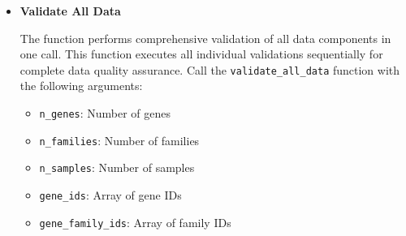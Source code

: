 \begin{enumerate}
\begin{itemize}
\begin{itemize}
                    \item \texttt{expression\_vectors}: 2D array of expression data (samples
                          × genes)
                          
                    \item \texttt{family\_centroids}: 2D array of family centroids (samples
                          × families)
                          
                    \item \texttt{shift\_vectors}: 2D array of shift vectors (genes ×
                          samples)
                  \end{itemize}
                  
                  \begin{lstlisting}[language=Python, caption={Python Validate Data Structure}]
validate_data_structure(n_genes, n_families, n_samples, gene_ids, 
                gene_family_ids, gene_to_fam, expression_vectors, 
                family_centroids, shift_vectors)
                  \end{lstlisting}
                  
            \item \textbf{Validate All Data}
                  
                  The function performs comprehensive validation of all data components in
                  one call. This function executes all individual validations
                  sequentially for complete data quality assurance. Call the \texttt{validate\_all\_data}
                  function with the following arguments:
                  
                  \begin{itemize}
                    \item \texttt{n\_genes}: Number of genes
                          
                    \item \texttt{n\_families}: Number of families
                          
                    \item \texttt{n\_samples}: Number of samples
                          
                    \item \texttt{gene\_ids}: Array of gene IDs
                          
                    \item \texttt{gene\_family\_ids}: Array of family IDs
                          

\end{itemize}
\end{itemize}
\end{enumerate}

